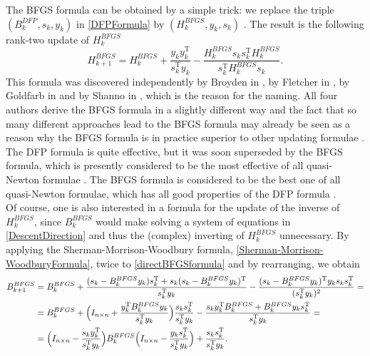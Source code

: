 The BFGS formula can be obtained by a simple trick: we replace the triple $(B^{DFP}_k,s_k,y_k)$ in \cref{DFPFormula} by $(H^{BFGS}_k,y_k,s_k)$ \cite{SunYuan:2006}. The result is the following rank-two update of $H^{BFGS}_k$
\begin{equation}\label{directBFGSformula}
    H^{BFGS}_{k+1} = H^{BFGS}_k + \frac{y_k y^{\mathrm{T}}_k}{s^{\mathrm{T}}_k y_k} - \frac{H^{BFGS}_k s_k s^{\mathrm{T}}_k H^{BFGS}_k}{s^{\mathrm{T}}_k H^{BFGS}_k s_k}.
\end{equation}
This formula was discovered independently by Broyden in \cite{Broyden:1967}, by Fletcher in \cite{Fletcher:1970}, by Goldfarb in \cite{Goldfarb:1970} and by Shanno in \cite{Shanno:1970}, which is the reason for the naming. 
All four authors derive the BFGS formula in a slightly different way and the fact that so many different approaches lead to the BFGS formula may already be seen as a reason why the BFGS formula is in practice superior to other updating formulae \cite[p.~136]{GeigerKanzow:1999}. The DFP formula is quite effective, but it was soon superseded by the BFGS formula, which is presently considered to be the most effective of all quasi-Newton formulae \cite[p.~139]{NocedalWright:2006}. The BFGS formula is considered to be the best one of all quasi-Newton formulae, which has all good properties of the DFP formula \cite[p.~219]{SunYuan:2006}. \\
Of course, one is also interested in a formula for the update of the inverse of $H^{BFGS}_k$, since $B^{BFGS}_k$ would make solving a system of equations in \cref{DescentDirection} and thus the (complex) inverting of $H^{BFGS}_k$ unnecessary. By applying the Sherman-Morrison-Woodbury formula, \cref{Sherman-Morrison-WoodburyFormula}, twice to \cref{directBFGSformula} and by rearranging, we obtain
\begin{equation}\label{inverseBFGSformula}
    \begin{split}
        B^{BFGS}_{k+1} &= B^{BFGS}_k + \frac{(s_k - B^{BFGS}_k y_k) s^{\mathrm{T}}_k + s_k (s_k - B^{BFGS}_k y_k)^{\mathrm{T}}}{s^{\mathrm{T}}_k y_k} - \frac{(s_k - B^{BFGS}_k y_k)^{\mathrm{T}} y_k s_k s^{\mathrm{T}}_k}{(s^{\mathrm{T}}_k y_k)^2} = \\
        &= B^{BFGS}_k + \Big{(} I_{n \times n} + \frac{y^{\mathrm{T}}_k B^{BFGS}_k y_k}{s^{\mathrm{T}}_k y_k} \Big{)} \frac{s_k s^{\mathrm{T}}_k}{s^{\mathrm{T}}_k y_k} - \frac{s_k y^{\mathrm{T}}_k B^{BFGS}_k + B^{BFGS}_k y_k s^{\mathrm{T}}_k}{s^{\mathrm{T}}_k y_k} = \\
        &= \Big{(} I_{n \times n} - \frac{s_k y^{\mathrm{T}}_k}{s_k^{\mathrm{T}} y_k} \Big{)} B^{BFGS}_k \Big{(} I_{n \times n} - \frac{y_k s^{\mathrm{T}}_k}{s_k^{\mathrm{T}} y_k} \Big{)} + \frac{s_k s^{\mathrm{T}}_k}{s_k^{\mathrm{T}} y_k}.
    \end{split}
\end{equation}
